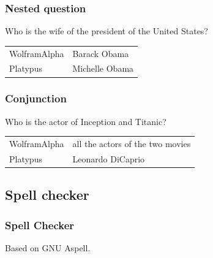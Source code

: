 \begin{frame}
    \frametitle{Nested question}

Who is the wife of the president of the United States?
    \begin{tabular}{ll}
        \alert{WolframAlpha} & Barack Obama\\
        \alert{Platypus} & Michelle Obama\\
    \end{tabular}

    \medbreak

\end{frame}

\begin{frame}[fragile]
    \frametitle{Conjunction}

Who is the actor of Inception and Titanic?
    \begin{tabular}{ll}
        \alert{WolframAlpha} & all the actors of the two movies\\
        \alert{Platypus} & Leonardo DiCaprio\\
    \end{tabular}
\end{frame}

\subsection{Spell checker}

\begin{frame}[fragile]
    \frametitle{Spell Checker}
    Based on \alert{GNU Aspell}.

    \medbreak


    \medbreak

\end{frame}
